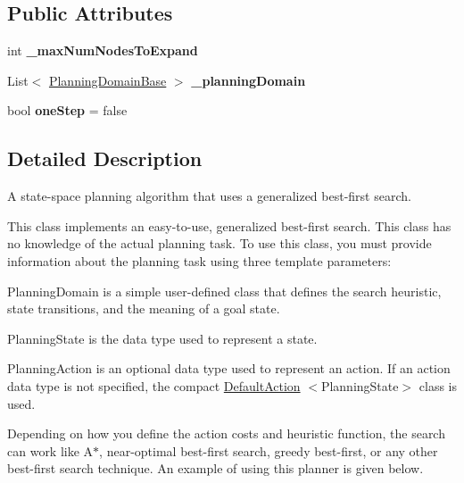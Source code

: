 \subsection*{Public Attributes}
\begin{DoxyCompactItemize}
\item 
\hypertarget{class_best_first_search_planner_a6cf3eaf1dece9104e57734fe46dc5c18}{int {\bfseries \-\_\-max\-Num\-Nodes\-To\-Expand}}\label{class_best_first_search_planner_a6cf3eaf1dece9104e57734fe46dc5c18}

\item 
\hypertarget{class_best_first_search_planner_a1ad8d9c366c660e9f9713118abdd9274}{List$<$ \hyperlink{class_planning_domain_base}{Planning\-Domain\-Base} $>$ {\bfseries \-\_\-planning\-Domain}}\label{class_best_first_search_planner_a1ad8d9c366c660e9f9713118abdd9274}

\item 
\hypertarget{class_best_first_search_planner_a257de3dcc541f70ef5be8bcb63ce8471}{bool {\bfseries one\-Step} = false}\label{class_best_first_search_planner_a257de3dcc541f70ef5be8bcb63ce8471}

\end{DoxyCompactItemize}


\subsection{Detailed Description}
A state-\/space planning algorithm that uses a generalized best-\/first search. 

This class implements an easy-\/to-\/use, generalized best-\/first search. This class has no knowledge of the actual planning task. To use this class, you must provide information about the planning task using three template parameters\-:
\begin{DoxyItemize}
\item Planning\-Domain is a simple user-\/defined class that defines the search heuristic, state transitions, and the meaning of a goal state.
\item Planning\-State is the data type used to represent a state.
\item Planning\-Action is an optional data type used to represent an action. If an action data type is not specified, the compact \hyperlink{class_default_action}{Default\-Action} $<$Planning\-State$>$ class is used.
\end{DoxyItemize}

Depending on how you define the action costs and heuristic function, the search can work like A$\ast$, near-\/optimal best-\/first search, greedy best-\/first, or any other best-\/first search technique. An example of using this planner is given below.

